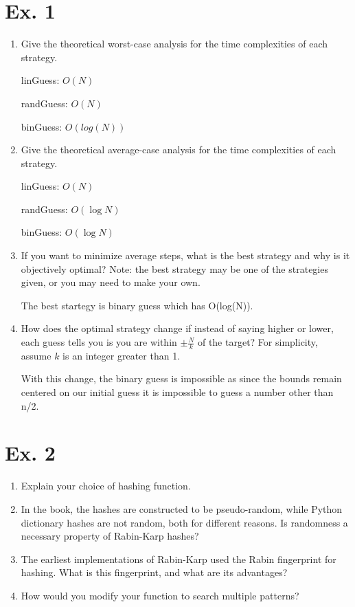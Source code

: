 \documentclass{article}
\begin{document}
\section{Ex. 1}
\begin{enumerate}
    \item Give the theoretical worst-case analysis for the time complexities of each strategy.
    
    linGuess: $O(N)$
    
    randGuess: $O(N)$
    
    binGuess: $O(log(N))$
    
    \item Give the theoretical average-case analysis for the time complexities of each strategy.
    
    linGuess: $O(N)$

    randGuess: $O(\log N)$

    binGuess: $O(\log N)$
    
    \item If you want to minimize average steps, what is the best strategy and why is it objectively optimal? Note: the best strategy may be one of the strategies given, or you may need to make your own.
    
    The best startegy is binary guess which has O(log(N)).

    \item How does the optimal strategy change if instead of saying higher or lower, each guess tells you is you are within $\pm \frac{N}{k}$ of the target? For simplicity, assume $k$ is an integer greater than 1.

    With this change, the binary guess is impossible as since the bounds remain centered on our initial guess it is impossible to guess a number other than n/2.

\end{enumerate}

\section{Ex. 2}
\begin{enumerate}
    \item Explain your choice of hashing function.  
    
    
    
    \item In the book, the hashes are constructed to be pseudo-random, while Python dictionary hashes are not random, both for different reasons. Is randomness a necessary property of Rabin-Karp hashes?
    
    
    
    \item The earliest implementations of Rabin-Karp used the Rabin fingerprint for hashing. What is this fingerprint, and what are its advantages?  
    
    
    
    \item How would you modify your function to search multiple patterns? 



\end{enumerate}
\end{document}
